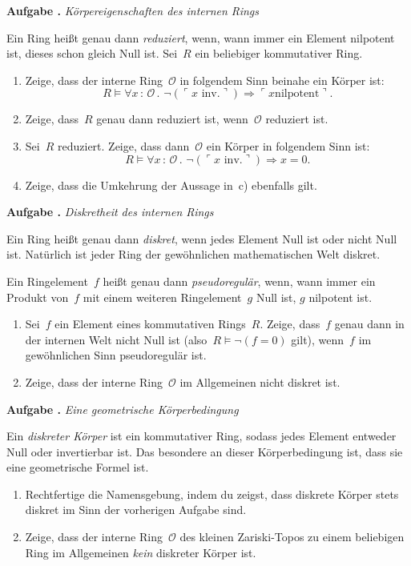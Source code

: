 \documentclass[a4paper,ngerman,12pt]{scrartcl}
\theoremstyle{definition}
\theoremstyle{plain}
\theoremstyle{remark}
\renewcommand{\O}{\mathcal{O}}
\renewcommand{\_}{\mathpunct{.}\,}
\newcommand{\?}{\,{:}\,}
\newcommand{\speak}[1]{\ulcorner\text{#1}\urcorner}
\newlength{\aufgabenskip}
\newcounter{aufgabennummer}
\newenvironment{aufgabe}[1]{
  \addtocounter{aufgabennummer}{1}
  \textbf{Aufgabe \theaufgabennummer{}.} \emph{#1} \par
}{\vspace{\aufgabenskip}}
\begin{document}
\begin{aufgabe}{Körpereigenschaften des internen Rings}
Ein Ring heißt genau dann \emph{reduziert}, wenn, wann immer ein Element
nilpotent ist, dieses schon gleich Null ist.
Sei~$R$ ein beliebiger kommutativer Ring.
\begin{enumerate}
\item Zeige, dass der interne Ring~$\O$ in folgendem Sinn beinahe ein Körper
ist:
\[ R \models \forall x\?\O\_ \neg(\speak{$x$ inv.}) \Rightarrow \speak{$x$
nilpotent}. \]
\vspace*{-1.8em}%
\item Zeige, dass~$R$ genau dann reduziert ist, wenn~$\O$ reduziert ist.
\item Sei~$R$ reduziert. Zeige, dass dann~$\O$ ein Körper in folgendem Sinn
ist:
\[ R \models \forall x\?\O\_ \neg(\speak{$x$ inv.}) \Rightarrow x = 0. \]
\vspace*{-1.8em}%
\item Zeige, dass die Umkehrung der Aussage in~c) ebenfalls gilt.
\end{enumerate}
\end{aufgabe}

\begin{aufgabe}{Diskretheit des internen Rings}
Ein Ring heißt genau dann \emph{diskret}, wenn jedes Element Null ist oder
nicht Null ist. Natürlich ist jeder Ring der gewöhnlichen mathematischen Welt
diskret.

Ein Ringelement~$f$ heißt genau dann \emph{pseudoregulär}, wenn,
wann immer ein Produkt von~$f$ mit einem weiteren Ringelement~$g$ Null ist, $g$
nilpotent ist.
\begin{enumerate}
\item Sei~$f$ ein Element eines kommutativen Rings~$R$. Zeige, dass~$f$ genau
dann in der internen Welt nicht Null ist (also~$R \models \neg(f = 0)$ gilt),
wenn~$f$ im gewöhnlichen Sinn pseudoregulär ist.
\item Zeige, dass der interne Ring~$\O$ im Allgemeinen nicht diskret ist.
\end{enumerate}
\end{aufgabe}

\begin{aufgabe}{Eine geometrische Körperbedingung}
Ein \emph{diskreter Körper} ist ein kommutativer Ring, sodass jedes Element
entweder Null oder invertierbar ist. Das besondere an dieser Körperbedingung
ist, dass sie eine geometrische Formel ist.
\begin{enumerate}
\item Rechtfertige die Namensgebung, indem du zeigst, dass diskrete Körper
stets diskret im Sinn der vorherigen Aufgabe sind.
\item Zeige, dass der
interne Ring~$\O$ des kleinen Zariski-Topos zu einem beliebigen Ring im
Allgemeinen \emph{kein} diskreter Körper ist.
\end{enumerate}
\end{aufgabe}
\end{document}
